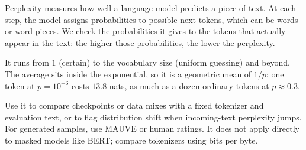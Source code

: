 \clearpage
\thispagestyle{genaistyle}
\label{sec:perplexity}


Perplexity measures how well a language model predicts a piece of text. At each step, the model assigns probabilities to possible
next tokens, which can be words or word pieces. We check the probabilities it gives to the tokens that actually appear in the text:
the higher those probabilities, the lower the perplexity.

\begin{metricformula}
\end{metricformula}

It runs from $1$ (certain) to the vocabulary size (uniform guessing) and beyond. The average sits inside the exponential, so it is a
geometric mean of $1/p$: one token at $p = 10^{-6}$ costs $13.8$ nats, as much as a dozen ordinary tokens at $p \approx 0.3$.


Use it to compare checkpoints or data mixes with a fixed tokenizer and evaluation text, or to flag distribution shift when incoming-text perplexity jumps. For generated samples, use MAUVE or human ratings. It does not apply directly to masked models like BERT; compare tokenizers using bits per byte.


